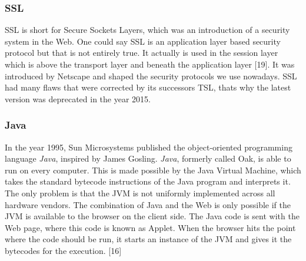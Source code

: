 \documentclass[runningheads]{llncs}
\begin{document}
			\subsubsection{SSL}
			\leavevmode\newline
			SSL is short for Secure Sockets Layers, which was an introduction of a security system in the Web. One could say SSL is an application layer based security protocol but that is not entirely true. It actually is used in the session layer which is above the transport layer and beneath the application layer [19]. It was introduced by Netscape and shaped the security protocols we use nowadays. SSL had many flaws that were corrected by its successors TSL, thats why the latest version was deprecated in the year 2015.
			\subsubsection{Java}
			\leavevmode\newline
			In the year 1995, Sun Microsystems published the object-oriented programming language \textit{Java}, inspired by James Gosling. \textit{Java}, formerly called Oak, is able to run on every computer. This is made possible by the Java Virtual Machine, which takes the standard bytecode instructions of the Java program and interprets it. The only problem is that the JVM is not uniformly implemented across all hardware vendors. The combination of Java and the Web is only possible if the JVM is available to the browser on the client side. The Java code is sent with the Web page, where this code is known as Applet. When the browser hits the point where the code should be run, it starts an instance of the JVM and gives it the bytecodes for the execution. [16]
\end{document}
